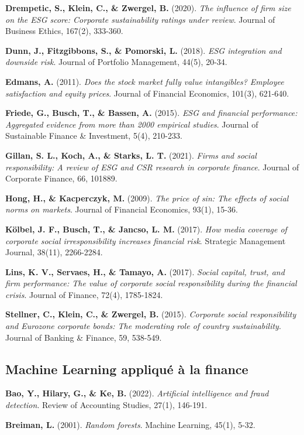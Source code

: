 \textbf{Drempetic, S., Klein, C., \& Zwergel, B.} (2020). \textit{The influence of firm size on the ESG score: Corporate sustainability ratings under review}. Journal of Business Ethics, 167(2), 333-360.

\textbf{Dunn, J., Fitzgibbons, S., \& Pomorski, L.} (2018). \textit{ESG integration and downside risk}. Journal of Portfolio Management, 44(5), 20-34.

\textbf{Edmans, A.} (2011). \textit{Does the stock market fully value intangibles? Employee satisfaction and equity prices}. Journal of Financial Economics, 101(3), 621-640.

\textbf{Friede, G., Busch, T., \& Bassen, A.} (2015). \textit{ESG and financial performance: Aggregated evidence from more than 2000 empirical studies}. Journal of Sustainable Finance \& Investment, 5(4), 210-233.

\textbf{Gillan, S. L., Koch, A., \& Starks, L. T.} (2021). \textit{Firms and social responsibility: A review of ESG and CSR research in corporate finance}. Journal of Corporate Finance, 66, 101889.

\textbf{Hong, H., \& Kacperczyk, M.} (2009). \textit{The price of sin: The effects of social norms on markets}. Journal of Financial Economics, 93(1), 15-36.

\textbf{Kölbel, J. F., Busch, T., \& Jancso, L. M.} (2017). \textit{How media coverage of corporate social irresponsibility increases financial risk}. Strategic Management Journal, 38(11), 2266-2284.

\textbf{Lins, K. V., Servaes, H., \& Tamayo, A.} (2017). \textit{Social capital, trust, and firm performance: The value of corporate social responsibility during the financial crisis}. Journal of Finance, 72(4), 1785-1824.

\textbf{Stellner, C., Klein, C., \& Zwergel, B.} (2015). \textit{Corporate social responsibility and Eurozone corporate bonds: The moderating role of country sustainability}. Journal of Banking \& Finance, 59, 538-549.

\subsection{Machine Learning appliqué à la finance}

\textbf{Bao, Y., Hilary, G., \& Ke, B.} (2022). \textit{Artificial intelligence and fraud detection}. Review of Accounting Studies, 27(1), 146-191.

\textbf{Breiman, L.} (2001). \textit{Random forests}. Machine Learning, 45(1), 5-32.

